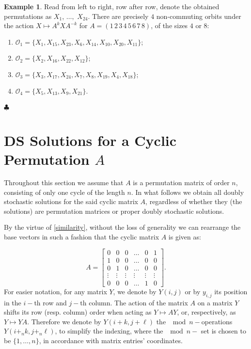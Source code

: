 \documentclass{article}
\theoremstyle{definition}\newtheorem{example}{Example}[section]
\begin{document}
\begin{example}
	Read from left to right, row after row, denote the obtained permutations as $X_1$, $\ldots,$ $X_{24}$. There are precisely $4$ non-commuting orbits under the action $X\mapsto A^k XA^{-k}$ for $A=(1\,2\,3\,4\,5\,6\,7\,8)$, of the sizes $4$ or $8$:
		\begin{enumerate}
			\item $\mathcal O_1=\{X_1, X_{15}, X_{23}, X_6, X_{14}, X_{10}, X_{20}, X_{11}\}$;
			\item $\mathcal O_2=\{X_2, X_{16}, X_{22}, X_{12}\}$;
			\item $\mathcal O_3=\{X_3, X_{17}, X_{24}, X_7, X_8, X_{19}, X_4, X_{18}\}$;
			\item $\mathcal O_4=\{X_5, X_{13}, X_9, X_{21}\}$.
		\end{enumerate}
			\hfill$\clubsuit$
	\end{example}
	
	\section{DS Solutions for a Cyclic Permutation $A$}\label{cyclic}
	
	Throughout this section we assume that $A$ is a permutation matrix of order $n$, consisting of only one cycle of the length $n$. In what follows we obtain all doubly stochastic solutions for the said cyclic matrix $A$, regardless of whether they (the solutions) are permutation matrices or proper doubly stochastic solutions.
	
	By the virtue of \eqref{similarity}, without the loss of generality we can rearrange the base vectors in such a fashion that the cyclic matrix $A$ is given as:
	
	\begin{equation}
		\label{diagA}
		A=\left[\begin{array}{cccccc}
			0 & 0 & 0 & \ldots & 0 & 1\\
			1 & 0 & 0 &\ldots & 0 & 0\\
			0 & 1 & 0 & \ldots & 0 & 0 \\
			\vdots & \vdots& \vdots& \vdots& \vdots &\vdots\\
			0 & 0 & 0 &\ldots & 1 & 0
		\end{array}\right].
	\end{equation}
	For easier notation, for any matrix $Y$, we denote by $Y(i,j)$ or by $y_{i,j}$ its position in the $i-$th row and $j-$th column. The action of the matrix $A$ on a matrix $Y$ shifts its row (resp. column) order when acting as $Y\mapsto AY$, or, respectively, as $Y\mapsto YA$. Therefore we denote by $Y(i+k, j+\ell)$ the $\mod n-$operations $Y\left(i+_nk,j+_n\ell\right)$, to simplify the indexing, where the $\mod n-$ set is chosen to be $\{1,\ldots,n\}$, in accordance with matrix entries' coordinates.
	
\end{document}
